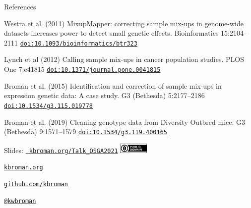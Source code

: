 \documentclass[aspectratio=169,12pt,t]{beamer}
\begin{document}
\begin{frame}[c]{References}

  \bbi

  \item Westra et al. (2011) MixupMapper: correcting sample mix-ups in
    genome-wide datasets increases power to detect small genetic
    effects. Bioinformatics 15:2104--2111
    \href{https://doi.org/10.1093/bioinformatics/btr323}{\tt doi:10.1093/bioinformatics/btr323}

  \item Lynch et al (2012) Calling sample mix-ups in cancer population
    studies. PLOS One 7:e41815
    \href{https://doi.org/10.1371/journal.pone.0041815}{\tt doi:10.1371/journal.pone.0041815}

  \item Broman et al. (2015) Identification and correction of sample
    mix-ups in expression genetic data: A case study. G3 (Bethesda)
    5:2177--2186
    \href{https://doi.org/10.1534/g3.115.019778}{\tt doi:10.1534/g3.115.019778}

  \item Broman et al. (2019) Cleaning genotype data from Diversity
    Outbred mice. G3 (Bethesda) 9:1571--1579
    \href{https://doi.org/10.1534/g3.119.400165}{\tt doi:10.1534/g3.119.400165}

  \ei


\end{frame}


\begin{frame}[c]{}

\Large

Slides: \href{https://kbroman.org/Talk_OSGA2021}{\tt
  kbroman.org/Talk\_OSGA2021} \quad
\includegraphics[height=5mm]{Figs/cc-zero.png}

\vspace{7mm}

\href{https://kbroman.org}{\tt \lolit kbroman.org}

\vspace{7mm}

\href{https://github.com/kbroman}{\tt \lolit github.com/kbroman}

\vspace{7mm}

\href{https://twitter.com/kwbroman}{\tt \lolit @kwbroman}


\end{frame}
\end{document}
